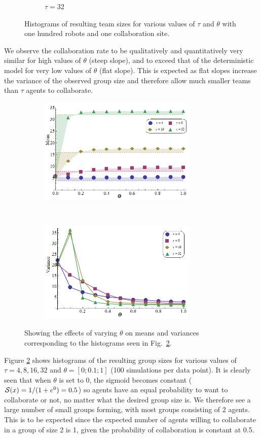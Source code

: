 \documentclass[Main.tex]{subfiles}
\begin{document}
\begin{figure}[!htb]
\begin{subfigure}{0.5\textwidth}
\centering\caption{$\tau = 32$}\label{fig:collabsweep32}
\end{subfigure}
\caption{Histograms of resulting team sizes for various values of $\tau$ and $\theta$ with one hundred robots and one collaboration site.}\label{fig:collabsweep}
\end{figure}

We observe the collaboration rate to be qualitatively and quantitatively very similar for high values of $\theta$ (steep slope), and to exceed that of the deterministic model for very low values of $\theta$ (flat slope). This is expected as flat slopes increase the variance of the observed group size and therefore allow much smaller teams than $\tau$ agents to collaborate.

\begin{figure}[!htb]
\begin{subfigure}{0.5\textwidth}
\centering\includegraphics[width=7.5cm]{assets/means.png}
\centering\caption{}\label{fig:means}
\end{subfigure}~
\begin{subfigure}{0.5\textwidth}
\centering\includegraphics[width=7.5cm]{assets/variances.png}
\centering\caption{}\label{fig:vars}
\end{subfigure}
\caption{Showing the effects of varying $\theta$ on means and variances corresponding to the histograms seen in Fig.~\ref{fig:collabsweep}.}\label{fig:meansvars}
\end{figure}

Figure \ref{fig:collabsweep} shows histograms of the resulting group sizes for various values of $\tau=4, 8, 16, 32$ and $\theta=[0;0.1;1]$ (100 simulations per data point). It is clearly seen that when $\theta$ is set to 0, the sigmoid becomes constant ($\mathcal{S}(x) = 1/(1 + e^{0}) = 0.5$) so agents have an equal probability to want to collaborate or not, no matter what the desired group size is. We therefore see a large number of small groups forming, with most groups consisting of 2 agents. This is to be expected since the expected number of agents willing to collaborate in a group of size 2 is 1, given the probability of collaboration is constant at 0.5.
\end{document}
